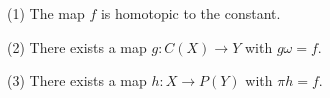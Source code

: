 (1) The map $f$ is homotopic to the constant.

(2) There exists a map $g: C(X) \rightarrow Y$ with $g\omega = f$.

(3) There exists a map $h: X \rightarrow P(Y)$ with $\pi h = f$.
